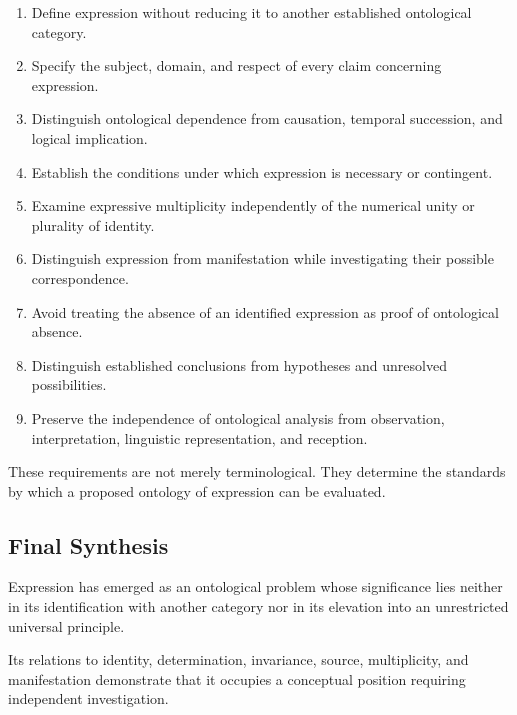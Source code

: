 \begin{enumerate}
    \item Define expression without reducing it
    to another established ontological category.

    \item Specify the subject, domain, and respect
    of every claim concerning expression.

    \item Distinguish ontological dependence from
    causation, temporal succession, and logical
    implication.

    \item Establish the conditions under which
    expression is necessary or contingent.

    \item Examine expressive multiplicity independently
    of the numerical unity or plurality of identity.

    \item Distinguish expression from manifestation
    while investigating their possible correspondence.

    \item Avoid treating the absence of an identified
    expression as proof of ontological absence.

    \item Distinguish established conclusions from
    hypotheses and unresolved possibilities.

    \item Preserve the independence of ontological
    analysis from observation, interpretation,
    linguistic representation, and reception.
\end{enumerate}

These requirements are not merely terminological.
They determine the standards by which a proposed
ontology of expression can be evaluated.

\subsection{Final Synthesis}

Expression has emerged as an ontological problem
whose significance lies neither in its identification
with another category nor in its elevation into
an unrestricted universal principle.

Its relations to identity, determination, invariance,
source, multiplicity, and manifestation demonstrate
that it occupies a conceptual position requiring
independent investigation.


